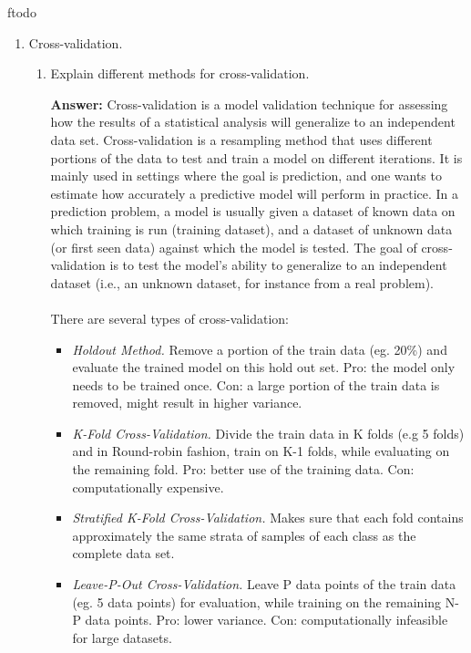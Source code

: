 ƒtodo\documentclass{article}
\newenvironment{QandA}{\begin{enumerate}[label=\arabic*.]}{\end{enumerate}}
\newenvironment{InnerQandA}{\begin{enumerate}[label=\roman*.]}{\end{enumerate}}
\newenvironment{answer}{\par\normalfont \textbf{Answer:}}{}
\begin{document}
\begin{QandA}
    \item Cross-validation.
    \begin{InnerQandA}
        \item Explain different methods for cross-validation.
        \begin{answer}
            Cross-validation is a model validation technique for assessing how the results of a statistical analysis will generalize to an independent data set. Cross-validation is a resampling method that uses different portions of the data to test and train a model on different iterations. It is mainly used in settings where the goal is prediction, and one wants to estimate how accurately a predictive model will perform in practice. In a prediction problem, a model is usually given a dataset of known data on which training is run (training dataset), and a dataset of unknown data (or first seen data) against which the model is tested. The goal of cross-validation is to test the model's ability to generalize to an independent dataset (i.e., an unknown dataset, for instance from a real problem).\\\\
            There are several types of cross-validation:
            \begin{itemize}
                \item \textit{Holdout Method.} Remove a portion of the train data (eg. 20\%) and evaluate the trained model on this hold out set. Pro: the model only needs to be trained once. Con: a large portion of the train data is removed, might result in higher variance.

                \item \textit{K-Fold Cross-Validation.} Divide the train data in K folds (e.g 5 folds) and in Round-robin fashion, train on K-1 folds, while evaluating on the remaining fold. Pro: better use of the training data. Con: computationally expensive. 

                \item \textit{Stratified K-Fold Cross-Validation.} Makes sure that each fold contains approximately the same strata of samples of each class as the complete data set.

                \item \textit{Leave-P-Out Cross-Validation. } Leave P data points of the train data (eg. 5 data points) for evaluation, while training on the remaining N-P data points. Pro: lower variance. Con: computationally infeasible for large datasets.
            \end{itemize}


\end{answer}
\end{InnerQandA}
\end{QandA}
\end{document}
